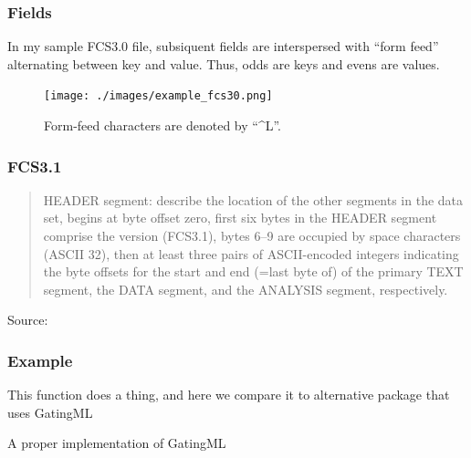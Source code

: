 \documentclass{beamer}
\begin{document}
\begin{frame}
  \frametitle{Fields}
  
  In my sample FCS3.0 file, subsiquent fields are interspersed with
  ``form feed'' alternating between key and value. Thus, odds are keys
  and evens are values.
  
  \begin{figure}
    \texttt{[image: ./images/example\_fcs30.png]}
    \caption{Form-feed characters are denoted by ``\string^L''.}
  \end{figure}
\end{frame}

\begin{frame}
  \frametitle{FCS3.1}
  \begin{quotation}
    HEADER segment: describe the location of the other segments in the
    data set, begins at byte offset zero, first six bytes in the HEADER
    segment comprise the version (FCS3.1), bytes 6--9 are occupied by
    space characters (ASCII 32), then at least three pairs of
    ASCII-encoded integers indicating the byte offsets for the start and
    end (=last byte of) of the primary TEXT segment, the DATA segment,
    and the ANALYSIS segment, respectively.
  \end{quotation}
  Source: \cite{parks2008data}
\end{frame}

\begin{frame}[fragile]
  \frametitle{Example}

  This function does a thing, and here we compare
  it to alternative package that uses GatingML
  
    A proper implementation of GatingML
\end{frame}

\nocite{*}


\end{document}
